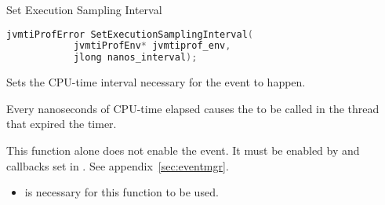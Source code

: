 \begin{apidef}{Set Execution Sampling Interval}
\begin{lstlisting}[language=C]
jvmtiProfError SetExecutionSamplingInterval(
            jvmtiProfEnv* jvmtiprof_env,
            jlong nanos_interval);
\end{lstlisting}

\begin{apidesc}
Sets the CPU-time interval necessary for the  event to happen.

\medskip
Every  nanoseconds of CPU-time elapsed causes the  to be called in the thread that expired the timer.

\medskip
This function alone does not enable the event. It must be enabled by  and callbacks set in . See appendix~\ref{sec:eventmgr}.
\end{apidesc}

\begin{apiphase}
\apiphaseany
\end{apiphase}

\begin{apicap}
\begin{itemize}
\item {} is necessary for this function to be used.
\end{itemize}
\end{apicap}

\begin{apiparam}
\end{apiparam}

\begin{apierror}
\end{apierror}
\end{apidef}
